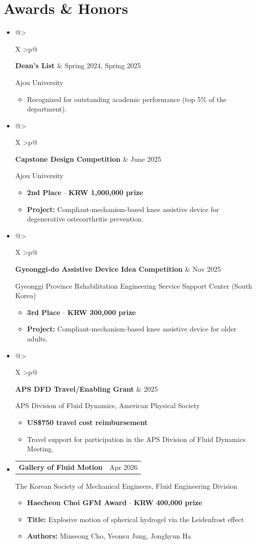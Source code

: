 \documentclass[a4paper,10pt]{article}
\makeatletter
\newcommand{\cvdate}[1]{\hfill \textcolor{textmain}{#1}}
\newcommand{\cvorg}[1]{\parbox[t]{\cvdetailwidth}{\textcolor{muted}{#1}}\par\vspace{-1pt}}
\newcommand{\cvaward}[1]{\textbf{#1}}
\newcommand{\cvfield}[2]{\textbf{#1:} #2}
\newcommand{\cvitemtitle}[2]{\textbf{\textcolor{textmain}{#1}}\cvdate{#2}}
\newcommand{\awardsep}{\textcolor{muted}{\(\cdot\)}}
\newlength{\cvdatewidth}
\newlength{\cvdetailwidth}
\renewcommand{\cvitemtitle}[2]{%
  \begin{tabularx}{\linewidth}{@{}>{\raggedright\arraybackslash}X >{\raggedleft\arraybackslash}p{\cvdatewidth}@{}}
    \textbf{\textcolor{textmain}{#1}} & \textcolor{textmain}{#2}
  \end{tabularx}\par\vspace{-1pt}
}
\newenvironment{cvdetailblock}
  {\begin{minipage}{\cvdetailwidth}\raggedright\begin{itemize}}
  {\end{itemize}\end{minipage}}
\makeatother
\begin{document}
\section*{Awards \& Honors}
\begin{itemize}
  \item \cvitemtitle{Dean's List}{Spring 2024, Spring 2025}
  \cvorg{Ajou University}
  \begin{cvdetailblock}
    \item Recognized for outstanding academic performance (top 5\% of the department).
  \end{cvdetailblock}

  \item \cvitemtitle{Capstone Design Competition}{June 2025}
  \cvorg{Ajou University}
  \begin{cvdetailblock}
    \item \cvaward{2nd Place \awardsep{} KRW 1,000,000 prize}
    \item \cvfield{Project}{Compliant-mechanism-based knee assistive device for degenerative osteoarthritis prevention.}
  \end{cvdetailblock}

  \item \cvitemtitle{Gyeonggi-do Assistive Device Idea Competition}{Nov 2025}
  \cvorg{Gyeonggi Province Rehabilitation Engineering Service Support Center (South Korea)}
  \begin{cvdetailblock}
    \item \cvaward{3rd Place \awardsep{} KRW 300,000 prize}
    \item \cvfield{Project}{Compliant-mechanism-based knee assistive device for older adults.}
  \end{cvdetailblock}

  \item \cvitemtitle{APS DFD Travel/Enabling Grant}{2025}
  \cvorg{APS Division of Fluid Dynamics, American Physical Society}
  \begin{cvdetailblock}
    \item \cvaward{US\$750 travel cost reimbursement}
    \item Travel support for participation in the APS Division of Fluid Dynamics Meeting.
  \end{cvdetailblock}

  \item \cvitemtitle{Gallery of Fluid Motion}{Apr 2026}
  \cvorg{The Korean Society of Mechanical Engineers, Fluid Engineering Division}
  \begin{cvdetailblock}
    \item \cvaward{Haecheon Choi GFM Award \awardsep{} KRW 400,000 prize}
    \item \cvfield{Title}{Explosive motion of spherical hydrogel via the Leidenfrost effect}
    \item \cvfield{Authors}{Minseong Cho, Yeonsu Jung, Jonghyun Ha}
  \end{cvdetailblock}
\end{itemize}
\end{document}
